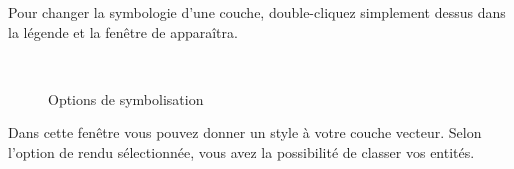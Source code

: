 Pour changer la symbologie d'une couche, double-cliquez simplement dessus dans la légende et la fenêtre de  apparaîtra.

\begin{figure}[h]
\centering
\caption{Options de symbolisation \nixcaption}
  \goodgap
  \\
  \goodgap
\end{figure}


 \label{sec:style_options}
Dans cette fenêtre vous pouvez donner un style à votre couche vecteur. Selon l'option de rendu sélectionnée, vous avez la possibilité de classer vos entités.

